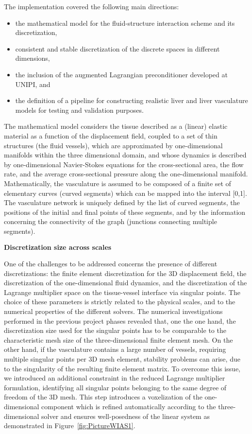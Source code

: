 \documentclass[a4paper,12pt]{article}
\begin{document}
The implementation covered the following main directions:
\begin{itemize}[left=1.5em, itemsep=0pt, topsep=0pt]
\item the mathematical model for the fluid-structure interaction scheme and its discretization,
\item consistent and stable discretization of the discrete spaces in different dimensions,
\item the inclusion of the augmented Lagrangian preconditioner developed at UNIPI, and
\item the definition of a pipeline for constructing realistic liver and liver vasculature models for testing and validation purposes.

\end{itemize}
The mathematical model considers the tissue described as a (linear) elastic material as a function of the displacement field, coupled to a set of thin structures (the fluid vessels), which are approximated by one-dimensional manifolds within the three dimensional domain, and whose dynamics is described by one-dimensional Navier-Stokes equations for the cross-sectional area, the flow rate, and the average cross-sectional pressure along the one-dimensional manifold. Mathematically, the vasculature is assumed to be composed of a finite set of elementary curves (curved segments) which can be mapped into the interval [0,1]. The vasculature network is uniquely defined by the list of curved segments, the positions of the initial and final points of these segments, and by the information concerning the connectivity of the graph (junctions connecting multiple segments).

\noindent\textbf{Discretization size across scales }

\noindent One of the challenges to be addressed concerns the presence of different discretizations: the finite element discretization for the 3D displacement field, the discretization of the one-dimensional fluid dynamics, and the discretization of the Lagrange multiplier space on the tissue-vessel interface via singular points. The choice of these parameters is strictly related to the physical scales, and  to the numerical properties of the different solvers. The numerical investigations performed in the previous project phases revealed that, one the one hand, the discretization size used for the singular points has to be comparable to the characteristic mesh size of the three-dimensional finite element mesh. On the other hand, if the vasculature contains a large number of vessels, requiring multiple singular points per 3D mesh element, stability problems can arise, due to the singularity of the resulting finite element matrix. To overcome this issue, we introduced an additional constraint in the reduced Lagrange multiplier formulation, identifying all singular points belonging to the same degree of freedom of the 3D mesh. This step introduces a voxelization of the one-dimensional component which is refined automatically according to the three-dimensional solver and ensures well-posedness of the linear system as demonstrated in Figure~\ref{fig:PictureWIAS1}.
\end{document}
